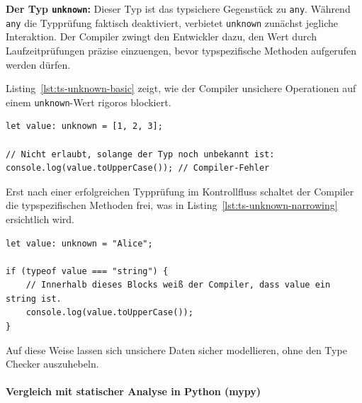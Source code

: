 \begin{definition}
\label{def:ts-unknown}
\textbf{Der Typ \texttt{unknown}:} Dieser Typ ist das typsichere Gegenstück zu \texttt{any}. Während \texttt{any} die Typprüfung faktisch deaktiviert, verbietet \texttt{unknown} zunächst jegliche Interaktion. Der Compiler zwingt den Entwickler dazu, den Wert durch Laufzeitprüfungen präzise einzuengen, bevor typspezifische Methoden aufgerufen werden dürfen.
\end{definition}

Listing~\ref{lst:ts-unknown-basic} zeigt, wie der Compiler unsichere Operationen auf einem \texttt{unknown}-Wert rigoros blockiert.

\begin{listing}[htbp]
    \caption{Der Typ \texttt{unknown} erzwingt eine vorherige Prüfung}
    \label{lst:ts-unknown-basic}
    \begin{verbatim}
let value: unknown = [1, 2, 3];

// Nicht erlaubt, solange der Typ noch unbekannt ist:
console.log(value.toUpperCase()); // Compiler-Fehler
    \end{verbatim}
\end{listing}

Erst nach einer erfolgreichen Typprüfung im Kontrollfluss schaltet der Compiler die typspezifischen Methoden frei, was in Listing~\ref{lst:ts-unknown-narrowing} ersichtlich wird.

\begin{listing}[htbp]
    \caption{Einengung von \texttt{unknown} durch Typprüfung im Kontrollfluss}
    \label{lst:ts-unknown-narrowing}
    \begin{verbatim}
let value: unknown = "Alice";

if (typeof value === "string") {
    // Innerhalb dieses Blocks weiß der Compiler, dass value ein string ist.
    console.log(value.toUpperCase());
}
    \end{verbatim}
\end{listing}

Auf diese Weise lassen sich unsichere Daten sicher modellieren, ohne den Type Checker auszuhebeln. 

\paragraph{Vergleich mit statischer Analyse in Python (mypy)}
\label{par:python-type-hints-mypy-vergleich}

